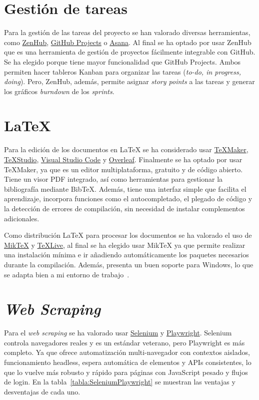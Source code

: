 \section{Gestión de tareas}
Para la gestión de las tareas del proyecto se han valorado diversas herramientas, como \href{https://www.zenhub.com/}{ZenHub}, \href{https://github.com/}{GitHub
  Projects} o \href{https://asana.com/es}{Asana}. Al final se ha optado por usar ZenHub que es una herramienta de gestión de proyectos fácilmente integrable con GitHub. Se ha elegido porque tiene mayor funcionalidad que GitHub Projects. Ambos permiten hacer tableros Kanban para organizar las tareas (\textit{to-do, in progress, doing}). Pero, ZenHub, además, permite asignar \textit{story points} a las tareas y generar los gráficos \textit{burndown} de los \textit{sprints}.

\section{\LaTeX{}}
Para la edición de los documentos en \LaTeX{} se ha considerado usar \href{http://www.xm1math.net/texmaker/}{\TeX{Maker}}, \href{https://www.texstudio.org/}{\TeX{Studio}}, \href{https://code.visualstudio.com/}{Visual Studio Code} y \href{https://es.overleaf.com/}{Overleaf}. Finalmente se ha optado por usar \TeX{Maker}, ya que es un editor multiplataforma, gratuito y de código abierto. Tiene un visor PDF integrado, así como herramientas para gestionar la bibliografía mediante Bib\TeX{}. Además, tiene una interfaz simple que facilita el aprendizaje, incorpora funciones como el autocompletado, el plegado de código y la detección de errores de compilación, sin necesidad de instalar complementos adicionales.

Como distribución \LaTeX{} para procesar los documentos  se ha valorado el uso de \href{https://miktex.org/}{Mik\TeX{}} y \href{https://www.tug.org/texlive/}{\TeX{Live}}, al final se ha elegido usar Mik\TeX{} ya que permite realizar una instalación mínima e ir añadiendo automáticamente los paquetes necesarios durante la compilación. Además, presenta un buen soporte para Windows, lo que se adapta bien a mi entorno de trabajo~\cite{miktex:textlive}.

\section{\textit{Web Scraping}}
Para el \textit{web scraping} se ha valorado usar \href{https://selenium-python.readthedocs.io/}{Selenium} y \href{https://playwright.dev/}{Playwright}.
Selenium controla navegadores reales y es un estándar veterano, pero Playwright es más completo. Ya que ofrece automatización multi-navegador con contextos aislados, funcionamiento headless, espera automática de elementos y APIs consistentes, lo que lo vuelve más robusto y rápido para páginas con JavaScript pesado y flujos de login. En la tabla~\ref{tabla:SeleniumPlaywright} se muestran las ventajas y desventajas de cada uno.

